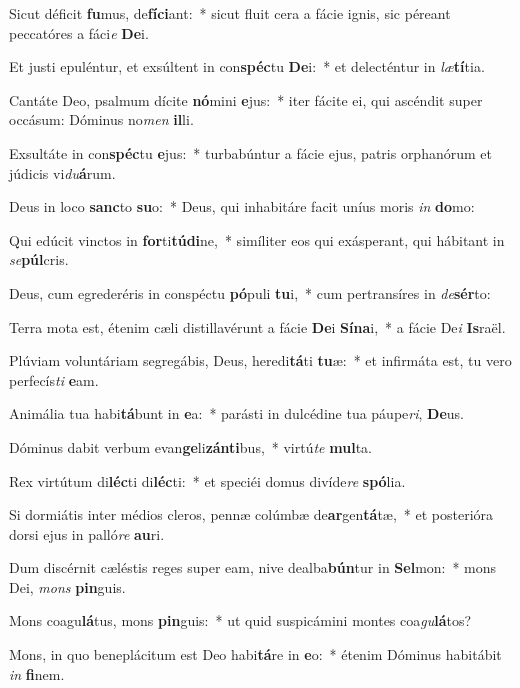 \item Sicut déficit \textbf{fu}mus, de\textbf{fí}\textbf{ci}ant:~* sicut fluit cera a fácie ignis, sic péreant peccatóres a fáci\textit{e} \textbf{De}i.
\item Et justi epuléntur, et exsúltent in con\textbf{spéc}tu \textbf{De}i:~* et delecténtur in \textit{læ}\textbf{tí}tia.
\item Cantáte Deo, psalmum dícite \textbf{nó}mini \textbf{e}jus:~* iter fácite ei, qui ascéndit super occásum: Dóminus no\textit{men} \textbf{il}li.
\item Exsultáte in con\textbf{spéc}tu \textbf{e}jus:~* turbabúntur a fácie ejus, patris orphanórum et júdicis vi\textit{du}\textbf{á}rum.
\item Deus in loco \textbf{sanc}to \textbf{su}o:~* Deus, qui inhabitáre facit uníus moris \textit{in} \textbf{do}mo:
\item Qui edúcit vinctos in \textbf{for}ti\textbf{tú}\textbf{di}ne,~* simíliter eos qui exásperant, qui hábitant in \textit{se}\textbf{púl}cris.
\item Deus, cum egrederéris in conspéctu \textbf{pó}puli \textbf{tu}i,~* cum pertransíres in \textit{de}\textbf{sér}to:
\item Terra mota est, étenim cæli distillavérunt a fácie \textbf{De}i \textbf{Sí}\textbf{na}i,~* a fácie De\textit{i} \textbf{Is}raël.
\item Plúviam voluntáriam segregábis, Deus, heredi\textbf{tá}ti \textbf{tu}æ:~* et infirmáta est, tu vero perfecís\textit{ti} \textbf{e}am.
\item Animália tua habi\textbf{tá}bunt in \textbf{e}a:~* parásti in dulcédine tua páupe\textit{ri}, \textbf{De}us.
\item Dóminus dabit verbum evan\textbf{ge}li\textbf{zán}\textbf{ti}bus,~* virtú\textit{te} \textbf{mul}ta.
\item Rex virtútum di\textbf{léc}ti di\textbf{léc}ti:~* et speciéi domus divíde\textit{re} \textbf{spó}lia.
\item Si dormiátis inter médios cleros, pennæ colúmbæ de\textbf{ar}gen\textbf{tá}tæ,~* et posterióra dorsi ejus in palló\textit{re} \textbf{au}ri.
\item Dum discérnit cæléstis reges super eam, nive dealba\textbf{bún}tur in \textbf{Sel}mon:~* mons Dei, \textit{mons} \textbf{pin}guis.
\item Mons coagu\textbf{lá}tus, mons \textbf{pin}guis:~* ut quid suspicámini montes coa\textit{gu}\textbf{lá}tos?
\item Mons, in quo beneplácitum est Deo habi\textbf{tá}re in \textbf{e}o:~* étenim Dóminus habitábit \textit{in} \textbf{fi}nem.
